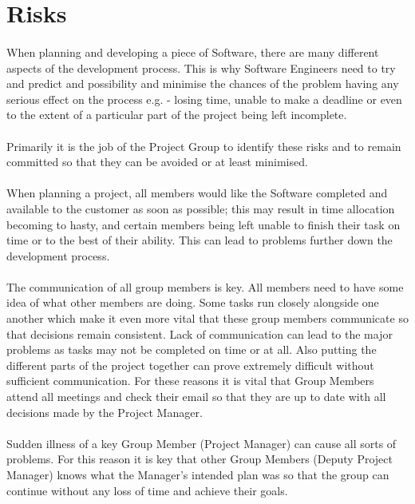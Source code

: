 \documentclass[titlepage]{article}
\begin{document}
\section{Risks}
\paragraph{}When planning and developing a piece of Software, there are many different aspects of the development process. This is why Software Engineers need to try and predict and possibility and minimise the chances of the problem having any serious effect on the process e.g. - losing time, unable to make a deadline or even to the extent of a particular part of the project being left incomplete.
\paragraph{}Primarily it is the job of the Project Group to identify these risks and to remain committed so that they can be avoided or at least minimised.
\paragraph{}When planning a project, all members would like the Software completed and available to the customer as soon as possible; this may result in time allocation becoming to hasty, and certain members being left unable to finish their task on time or to the best of their ability. This can lead to problems further down the development process. 
\paragraph{}The communication of all group members is key. All members need to have some idea of what other members are doing. Some tasks run closely alongside one another which make it even more vital that these group members communicate so that decisions remain consistent. Lack of communication can lead to the major problems as tasks may not be completed on time or at all. Also putting the different parts of the project together can prove extremely difficult without sufficient communication. For these reasons it is vital that Group Members attend all meetings and check their email so that they are up to date with all decisions made by the Project Manager. 
\paragraph{}Sudden illness of a key Group Member (Project Manager) can cause all sorts of problems. For this reason it is key that other Group Members (Deputy Project Manager) knows what the Manager's intended plan was so that the group can continue without any loss of time and achieve their goals.
\end{document}
